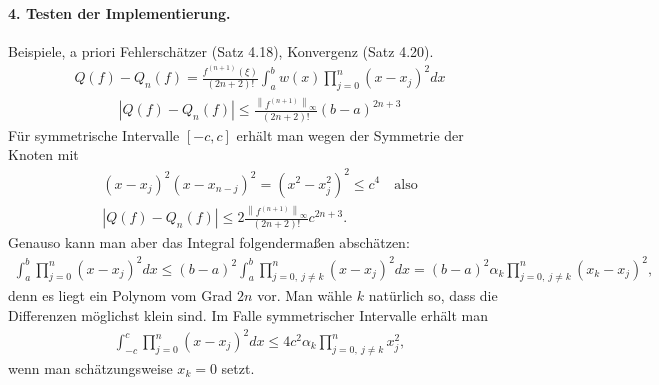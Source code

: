 \documentclass[french, 12pt, a4paper, onesided]{scrartcl}
\theoremstyle{plain}
\theoremstyle{definition}
\theoremstyle{remark}
\newcommand{\norm}[2][]{\left\|#2\right\|_{#1}}
\begin{document}
\paragraph{4. Testen der Implementierung.} Beispiele, a priori Fehlerschätzer (Satz 4.18), Konvergenz (Satz 4.20).
\begin{align*}
	Q(f)-Q_n(f)=\frac{f^{(n+1)}(\xi)}{(2n+2)!}\int_{a}^{b}w(x)\prod_{j=0}^{n}(x-x_j)^2dx 
\end{align*}
\begin{align}\label{eq:apriori1}
	|Q(f)-Q_n(f)|\leq\frac{\norm[\infty]{f^{(n+1)}}}{(2n+2)!}(b-a)^{2n+3}
\end{align}
Für symmetrische Intervalle $ [-c,c] $ erhält man wegen der Symmetrie der Knoten mit
\begin{align*}
	(x-x_j)^2(x-x_{n-j})^2=(x^2-x_j^2)^2\leq c^4\quad \text{also} \\
	|Q(f)-Q_n(f)|\leq 2 \frac{\norm[\infty]{f^{(n+1)}}}{(2n+2)!}c^{2n+3}.
\end{align*}
Genauso kann man aber das Integral folgendermaßen abschätzen:
\begin{align}\label{eq:apriori2}
	\int_{a}^{b}\prod_{j=0}^{n}(x-x_j)^2dx \leq (b-a)^2\int_{a}^{b}\prod_{j=0 , \ j\neq k}^{n}(x-x_j)^2dx=(b-a)^2\alpha_k\prod_{j=0 , \ j\neq k}^{n}(x_k-x_j)^2,
\end{align}
denn es liegt ein Polynom vom Grad $ 2n $ vor. Man wähle $ k $ natürlich so, dass die Differenzen möglichst klein sind. Im Falle symmetrischer Intervalle erhält man
\begin{align*}
	\int_{-c}^{c}\prod_{j=0}^{n}(x-x_j)^2dx \leq 4c^2\alpha_k\prod_{j=0 , \ j\neq k}^{n}x_j^2,
\end{align*}
wenn man schätzungsweise $ x_k=0 $ setzt.
\end{document}
